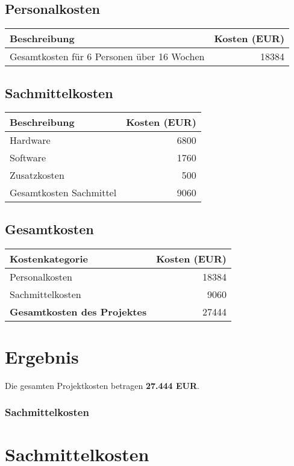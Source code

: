 \subsection*{Personalkosten}
\begin{tabular}{lr}
  \toprule
  \textbf{Beschreibung} & \textbf{Kosten (EUR)} \\
  \midrule
  Gesamtkosten für 6 Personen über 16 Wochen & 18384 \\
  \bottomrule
\end{tabular}

\subsection*{Sachmittelkosten}
\begin{tabular}{lr}
  \toprule
  \textbf{Beschreibung} & \textbf{Kosten (EUR)} \\
  \midrule
  Hardware & 6800 \\
  Software & 1760 \\
  Zusatzkosten & 500 \\
  \midrule
  Gesamtkosten Sachmittel & 9060 \\
  \bottomrule
\end{tabular}

\subsection*{Gesamtkosten}
\begin{tabular}{lr}
  \toprule
  \textbf{Kostenkategorie} & \textbf{Kosten (EUR)} \\
  \midrule
  Personalkosten & 18384 \\
  Sachmittelkosten & 9060 \\
  \midrule
  \textbf{Gesamtkosten des Projektes} & 27444 \\
  \bottomrule
\end{tabular}

\section*{Ergebnis}
Die gesamten Projektkosten betragen \textbf{27.444 EUR}.


\subsubsection{Sachmittelkosten}\label{sachmittelkosten}

\section*{Sachmittelkosten}

